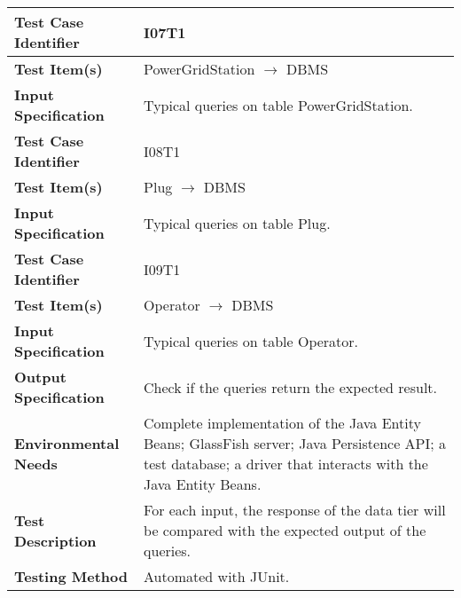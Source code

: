 \begin{tabular}{l p{}}
    \hline
    \hline
    \textbf{Test Case Identifier} & I07T1\\
    \hline
    \textbf{Test Item(s)} & PowerGridStation $\rightarrow$ DBMS \\
    \hline
    \textbf{Input Specification} & Typical queries on table PowerGridStation. \\
    \hline
    \hline
    \textbf{Test Case Identifier} & I08T1\\
    \hline
    \textbf{Test Item(s)} & Plug $\rightarrow$ DBMS \\
    \hline
    \textbf{Input Specification} & Typical queries on table Plug. \\
    \hline
    \hline
    \textbf{Test Case Identifier} & I09T1\\
    \hline
    \textbf{Test Item(s)} & Operator $\rightarrow$ DBMS \\
    \hline
    \textbf{Input Specification} & Typical queries on table Operator. \\
    \hline
    \hline
    \textbf{Output Specification} & Check if the queries return the expected result. \\
    \hline
    \textbf{Environmental Needs} & Complete implementation of the Java Entity Beans; GlassFish server; Java Persistence API; a test database; a driver that interacts with the Java Entity Beans.\\
    \hline
    \textbf{Test Description} & For each input, the response of the data tier will be compared with the expected output of the queries.\\
    \hline
    \textbf{Testing Method} & Automated with JUnit. \\
    \hline
\end{tabular}